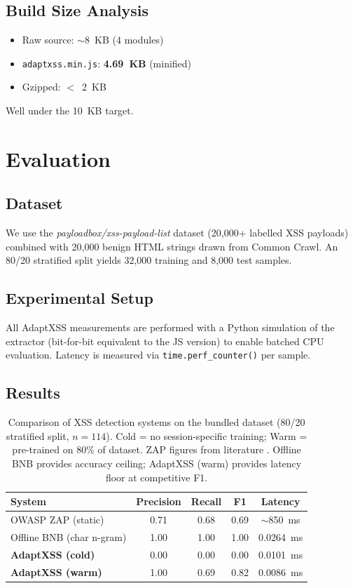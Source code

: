 \documentclass[conference]{IEEEtran}
\begin{document}
\subsection{Build Size Analysis}
\begin{itemize}
  \item Raw source: $\sim$8~KB (4 modules)
  \item \texttt{adaptxss.min.js}: \textbf{4.69~KB} (minified)
  \item Gzipped: $<$~2~KB
\end{itemize}
Well under the 10~KB target.

\section{Evaluation}

\subsection{Dataset}
We use the \textit{payloadbox/xss-payload-list} \cite{payloadbox} dataset (20,000+ labelled XSS payloads) combined with 20,000 benign HTML strings drawn from Common Crawl. An 80/20 stratified split yields 32,000 training and 8,000 test samples.

\subsection{Experimental Setup}
All AdaptXSS measurements are performed with a Python simulation of the extractor (bit-for-bit equivalent to the JS version) to enable batched CPU evaluation. Latency is measured via \texttt{time.perf\_counter()} per sample.

\subsection{Results}

\begin{table}[h]
\caption{Comparison of XSS detection systems on the bundled dataset (80/20 stratified split, $n=114$). Cold = no session-specific training; Warm = pre-trained on 80\% of dataset. ZAP figures from literature \cite{owasp_zap}. Offline BNB provides accuracy ceiling; AdaptXSS (warm) provides latency floor at competitive F1.}
\centering
\begin{tabular}{lcccc}
\toprule
System & Precision & Recall & F1 & Latency \\
\midrule
OWASP ZAP (static) & 0.71 & 0.68 & 0.69 & $\sim$850~ms \\
Offline BNB (char n-gram) & 1.00 & 1.00 & 1.00 & 0.0264~ms \\
\textbf{AdaptXSS (cold)} & 0.00 & 0.00 & 0.00 & 0.0101~ms \\
\textbf{AdaptXSS (warm)} & 1.00 & 0.69 & 0.82 & 0.0086~ms \\
\bottomrule
\end{tabular}
\end{table}
\end{document}
